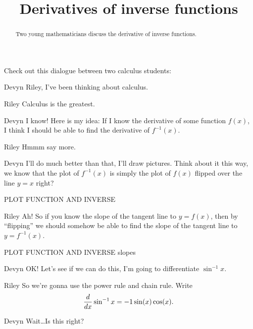 \documentclass{ximera}
\title[Break-Ground:]{Derivatives of inverse functions}
\begin{document}
\begin{abstract}
Two young mathematicians discuss the derivative of inverse functions.
\end{abstract}
\maketitle

Check out this dialogue between two calculus students:

\begin{dialogue}
\item[Devyn] Riley, I've been thinking about calculus.
\item[Riley] Calculus is the greatest.
\item[Devyn] I know! Here is my idea: If I know the derivative of some
  function $f(x)$, I think I should be able to find the derivative of
  $f^{-1}(x)$.
\item[Riley] Hmmm say more.
\item[Devyn] I'll do much better than that, I'll draw pictures. Think
  about it this way, we know that the plot of $f^{-1}(x)$ is simply
  the plot of $f(x)$ flipped over the line $y=x$ right?
  \begin{image}
  PLOT FUNCTION AND INVERSE  
  \end{image}
\item[Riley] Ah! So if you know the slope of the tangent line to
  $y=f(x)$, then by ``flipping'' we should somehow be able to find the
  slope of the tangent line to $y=f^{-1}(x)$.
  \begin{image}
  PLOT FUNCTION AND INVERSE slopes 
  \end{image}
\item[Devyn] OK! Let's see if we can do this, I'm going to
  differentiate $\sin^{-1} x$.
\item[Riley] So we're gonna use the power rule and chain rule. Write
  \begin{align*}
    \frac{d}{dx} \sin^{-1} x = -1 \sin(x) \cos(x).
  \end{align*}
\item[Devyn] Wait\dots Is this right?
\end{dialogue}





\end{document}
